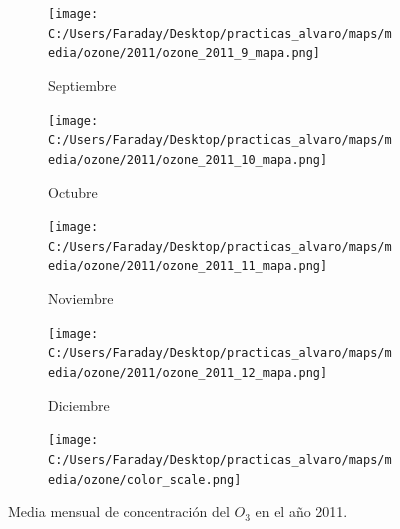 \documentclass[12pt]{beamer}
\begin{document}
\begin{frame}[squeeze]
\begin{figure}[H]
\begin{subfigure}[H]{0.20\textwidth}
\texttt{[image: C:/Users/Faraday/Desktop/practicas\_alvaro/maps/media/ozone/2011/ozone\_2011\_9\_mapa.png]}
\captionsetup{labelformat=empty}
\caption{\scriptsize Septiembre}
\label{fig:map-ozone-2011-9}
\end{subfigure}
%
\begin{subfigure}[H]{0.20\textwidth}
\texttt{[image: C:/Users/Faraday/Desktop/practicas\_alvaro/maps/media/ozone/2011/ozone\_2011\_10\_mapa.png]}
\captionsetup{labelformat=empty}
\caption{\scriptsize Octubre}
\label{fig:map-ozone-2011-10}
\end{subfigure}
%
\begin{subfigure}[H]{0.20\textwidth}
\texttt{[image: C:/Users/Faraday/Desktop/practicas\_alvaro/maps/media/ozone/2011/ozone\_2011\_11\_mapa.png]}
\captionsetup{labelformat=empty}
\caption{\scriptsize Noviembre}
\label{fig:map-ozone-2011-11}
\end{subfigure}
%
\begin{subfigure}[H]{0.20\textwidth}
\texttt{[image: C:/Users/Faraday/Desktop/practicas\_alvaro/maps/media/ozone/2011/ozone\_2011\_12\_mapa.png]}
\captionsetup{labelformat=empty}
\caption{\scriptsize Diciembre}
\label{fig:map-ozone-2011-12}
\end{subfigure}

\begin{subfigure}[H]{0.45\textwidth}
\texttt{[image: C:/Users/Faraday/Desktop/practicas\_alvaro/maps/media/ozone/color\_scale.png]}
\captionsetup{labelformat=empty}
\caption{}
\end{subfigure}

\vspace*{-7mm}
\caption{\scriptsize Media mensual de concentración del $O_{3}$ en el año 2011.}
\label{fig:map-ozone-2011}
\end{figure}
\end{frame}
\end{document}
